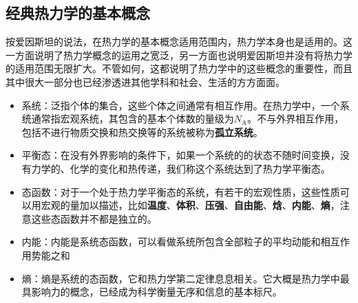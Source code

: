 \subsection{经典热力学的基本概念}
\qquad 按爱因斯坦的说法，在热力学的基本概念适用范围内，热力学本身也是适用的。这一方面说明了热力学概念的运用之宽泛，另一方面也说明爱因斯坦并没有将热力学的适用范围无限扩大。不管如何，这都说明了热力学中的这些概念的重要性，而且其中很大一部分也已经渗透进其他学科和社会、生活的方方面面。
\begin{itemize}
    \item 系统\cite{Wu2010}：泛指个体的集合，这些个体之间通常有相互作用。在热力学中，一个系统通常指宏观系统，其包含的基本个体数的量级为$N_{\mathrm{A}}$。不与外界相互作用，包括不进行物质交换和热交换等的系统被称为\textbf{孤立系统}。
    \item 平衡态：在没有外界影响的条件下，如果一个系统的的状态不随时间变换，没有力学的、化学的变化和热传递，我们称这个系统达到了热力学平衡态。
    \item 态函数：对于一个处于热力学平衡态的系统，有若干的宏观性质，这些性质可以用宏观的量加以描述，比如\textbf{温度}、\textbf{体积}、\textbf{压强}、\textbf{自由能}、\textbf{焓}、\textbf{内能}、\textbf{熵}，注意这些态函数并不都是独立的。
    \item 内能：内能是系统态函数，可以看做系统所包含全部粒子的平均动能和相互作用势能之和
    \item 熵：熵是系统的态函数，它和热力学第二定律息息相关。它大概是热力学中最具影响力的概念，已经成为科学衡量无序和信息的基本标尺。
\end{itemize}

